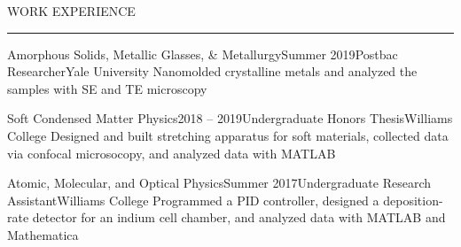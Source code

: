 \documentclass{short_resume} %
\renewenvironment{rSection}[1]{
	\sectionskip
	\textcolor{RoyalPurple}{\MakeUppercase{#1}}
	\sectionlineskip
	\hrule
	\begin{list}{}{
			\setlength{\leftmargin}{1.5em}
		}
		\item[]
	}{
	\end{list}
}
\begin{document}
	\begin{rSection}{Work Experience}
		\begin{rSubsection}{Amorphous Solids, Metallic Glasses, \& Metallurgy}{Summer 2019}{Postbac Researcher}{Yale University}
			Nanomolded crystalline metals and analyzed the samples with SE and TE microscopy
		\end{rSubsection}
		
		
		\begin{rSubsection}{Soft Condensed Matter Physics}{2018 -- 2019}{Undergraduate Honors Thesis}{Williams College}
			Designed and built stretching apparatus for soft materials, collected data via confocal microsocopy, and analyzed data with MATLAB
		\end{rSubsection}
		
		
		\begin{rSubsection}{Atomic, Molecular, and Optical Physics}{Summer 2017}{Undergraduate Research Assistant}{Williams College}
			Programmed a PID controller, designed a deposition-rate detector for an indium cell chamber, and analyzed data with MATLAB and Mathematica
		\end{rSubsection}
		
	\end{rSection}
	
	
	
	
	
	
	
\end{document}
